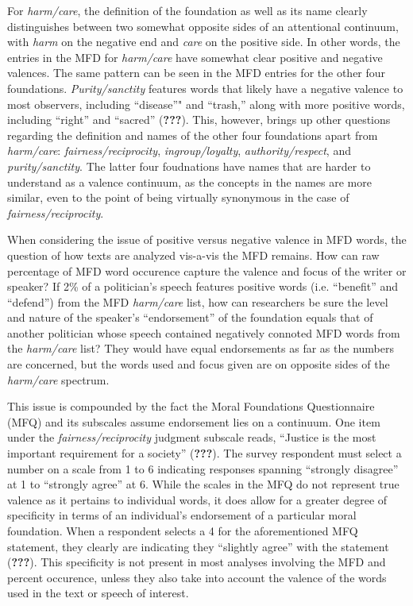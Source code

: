 \documentclass[,man]{apa6}
\theoremstyle{definition}
\theoremstyle{definition}
\theoremstyle{definition}
\theoremstyle{remark}
\begin{document}
For \emph{harm/care}, the definition of the foundation as well as its
name clearly distinguishes between two somewhat opposite sides of an
attentional continuum, with \emph{harm} on the negative end and
\emph{care} on the positive side. In other words, the entries in the MFD
for \emph{harm/care} have somewhat clear positive and negative valences.
The same pattern can be seen in the MFD entries for the other four
foundations. \emph{Purity/sanctity} features words that likely have a
negative valence to most observers, including \enquote{disease}" and
\enquote{trash,} along with more positive words, including
\enquote{right} and \enquote{sacred} ({\textbf{???}}). This, however,
brings up other questions regarding the definition and names of the
other four foundations apart from \emph{harm/care}:
\emph{fairness/reciprocity}, \emph{ingroup/loyalty},
\emph{authority/respect}, and \emph{purity/sanctity}. The latter four
foudnations have names that are harder to understand as a valence
continuum, as the concepts in the names are more similar, even to the
point of being virtually synonymous in the case of
\emph{fairness/reciprocity}.

When considering the issue of positive versus negative valence in MFD
words, the question of how texts are analyzed vis-a-vis the MFD remains.
How can raw percentage of MFD word occurence capture the valence and
focus of the writer or speaker? If 2\% of a politician's speech features
positive words (i.e. \enquote{benefit} and \enquote{defend}) from the
MFD \emph{harm/care} list, how can researchers be sure the level and
nature of the speaker's \enquote{endorsement} of the foundation equals
that of another politician whose speech contained negatively connoted
MFD words from the \emph{harm/care} list? They would have equal
endorsements as far as the numbers are concerned, but the words used and
focus given are on opposite sides of the \emph{harm/care} spectrum.

This issue is compounded by the fact the Moral Foundations Questionnaire
(MFQ) and its subscales assume endorsement lies on a continuum. One item
under the \emph{fairness/reciprocity} judgment subscale reads,
\enquote{Justice is the most important requirement for a society}
({\textbf{???}}). The survey respondent must select a number on a scale
from 1 to 6 indicating responses spanning \enquote{strongly disagree} at
1 to \enquote{strongly agree} at 6. While the scales in the MFQ do not
represent true valence as it pertains to individual words, it does allow
for a greater degree of specificity in terms of an individual's
endorsement of a particular moral foundation. When a respondent selects
a 4 for the aforementioned MFQ statement, they clearly are indicating
they \enquote{slightly agree} with the statement ({\textbf{???}}). This
specificity is not present in most analyses involving the MFD and
percent occurence, unless they also take into account the valence of the
words used in the text or speech of interest.
\end{document}
